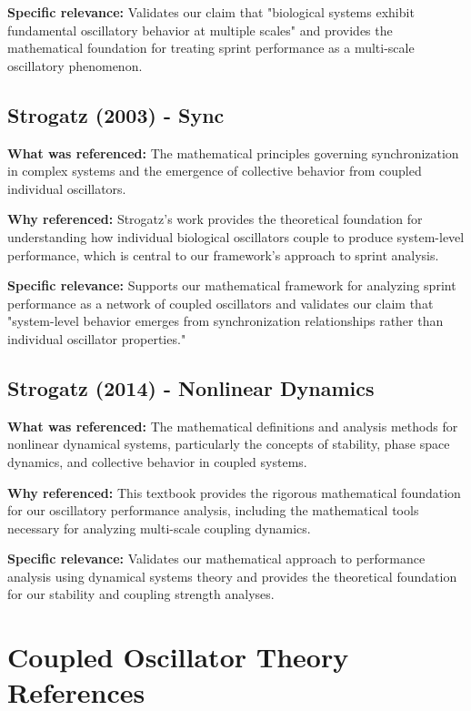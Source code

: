 \documentclass{article}
\begin{document}
\textbf{Specific relevance:} Validates our claim that "biological systems exhibit fundamental oscillatory behavior at multiple scales" and provides the mathematical foundation for treating sprint performance as a multi-scale oscillatory phenomenon.

\subsection{Strogatz (2003) - Sync}

\textbf{What was referenced:} The mathematical principles governing synchronization in complex systems and the emergence of collective behavior from coupled individual oscillators.

\textbf{Why referenced:} Strogatz's work provides the theoretical foundation for understanding how individual biological oscillators couple to produce system-level performance, which is central to our framework's approach to sprint analysis.

\textbf{Specific relevance:} Supports our mathematical framework for analyzing sprint performance as a network of coupled oscillators and validates our claim that "system-level behavior emerges from synchronization relationships rather than individual oscillator properties."

\subsection{Strogatz (2014) - Nonlinear Dynamics}

\textbf{What was referenced:} The mathematical definitions and analysis methods for nonlinear dynamical systems, particularly the concepts of stability, phase space dynamics, and collective behavior in coupled systems.

\textbf{Why referenced:} This textbook provides the rigorous mathematical foundation for our oscillatory performance analysis, including the mathematical tools necessary for analyzing multi-scale coupling dynamics.

\textbf{Specific relevance:} Validates our mathematical approach to performance analysis using dynamical systems theory and provides the theoretical foundation for our stability and coupling strength analyses.

\section{Coupled Oscillator Theory References}
\end{document}

